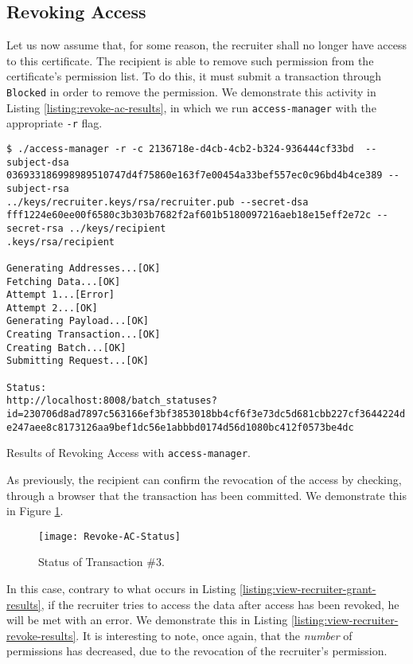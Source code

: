 \subsection{Revoking Access}
\label{sec:impl-revoke-ac}

Let us now assume that, for some reason, the recruiter shall no longer have access to this certificate. The recipient is able to remove such permission from the certificate's permission list. To do this, it must submit a transaction through \texttt{Blocked} in order to remove the permission. We demonstrate this activity in Listing \ref{listing:revoke-ac-results}, in which we run \texttt{access-manager} with the appropriate \texttt{-r} flag.

\begin{listing}[ht]
	\begin{verbatim}
$ ./access-manager -r -c 2136718e-d4cb-4cb2-b324-936444cf33bd  --subject-dsa 036933186998989510747d4f75860e163f7e00454a33bef557ec0c96bd4b4ce389 --subject-rsa
../keys/recruiter.keys/rsa/recruiter.pub --secret-dsa fff1224e60ee00f6580c3b303b7682f2af601b5180097216aeb18e15eff2e72c --secret-rsa ../keys/recipient
.keys/rsa/recipient

Generating Addresses...[OK]
Fetching Data...[OK]
Attempt 1...[Error]
Attempt 2...[OK]
Generating Payload...[OK]
Creating Transaction...[OK]
Creating Batch...[OK]
Submitting Request...[OK]

Status:
http://localhost:8008/batch_statuses?id=230706d8ad7897c563166ef3bf3853018bb4cf6f3e73dc5d681cbb227cf3644224d
e247aee8c8173126aa9bef1dc56e1abbbd0174d56d1080bc412f0573be4dc
\end{verbatim}
	\caption{Results of Revoking Access with \texttt{access-manager}.}
	\label{listing:revoke-ac-results}
\end{listing}

As previously, the recipient can confirm the revocation of the access by checking, through a browser that the transaction has been committed. We demonstrate this in Figure \ref{fig:revoke-ac-status}.

\begin{figure}[htb]
	\centering
	\texttt{[image: Revoke-AC-Status]}
	\caption{Status of Transaction \#3.}
	\label{fig:revoke-ac-status}
\end{figure}

In this case, contrary to what occurs in Listing \ref{listing:view-recruiter-grant-results}, if the recruiter tries to access the data after access has been revoked, he will be met with an error. We demonstrate this in Listing \ref{listing:view-recruiter-revoke-results}. It is interesting to note, once again, that the \emph{number} of permissions has decreased, due to the revocation of the recruiter's permission.

